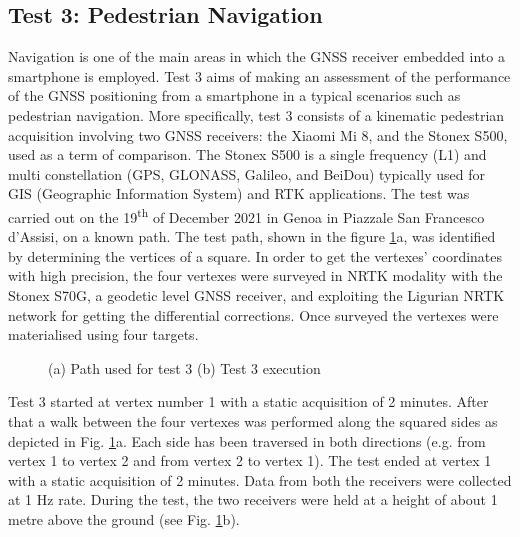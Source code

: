 \subsection{Test 3: Pedestrian Navigation}
Navigation is one of the main areas in which the GNSS receiver embedded into a smartphone is employed. 
Test 3 aims of making an assessment of the performance of the GNSS positioning from a smartphone in a typical 
scenarios such as  pedestrian navigation. 
More specifically, test 3 consists of a kinematic pedestrian acquisition involving two GNSS receivers: 
the Xiaomi Mi 8, and the Stonex S500, used as a term of comparison. The Stonex S500 is a single frequency (L1) 
and multi constellation (GPS, GLONASS, Galileo, and BeiDou) typically used for GIS (Geographic Information System) 
and RTK applications. 
The test was carried out on the 19\textsuperscript{th} of December 2021 in Genoa in Piazzale San Francesco d'Assisi, 
on a known path. The test path, shown in the figure \ref{FIG:test3_setup}a, was identified by determining the vertices of a 
square. In order to get the vertexes' coordinates with high precision, the four vertexes were surveyed in NRTK modality with 
the Stonex S70G, a geodetic level GNSS receiver, and exploiting the Ligurian NRTK network for getting the differential 
corrections. Once surveyed the vertexes were materialised using four targets. 
\begin{figure}[H] 
	\centering
    \caption{(a) Path used for test 3 (b) Test 3 execution}
	\label{FIG:test3_setup} 
\end{figure}
Test 3 started at vertex number 1 with a static acquisition of 2 minutes. 
After that a walk between the four vertexes was performed along the squared sides as depicted in Fig. \ref{FIG:test3_setup}a. 
Each side has been traversed in both directions (e.g. from vertex 1 to vertex 2 and from vertex 2 to vertex 1). 
The test ended at vertex 1 with a static acquisition of 2 minutes. Data from both the receivers were collected at 
1 Hz rate. During the test, the two receivers were held at a height of about 1 metre above the 
ground (see Fig. \ref{FIG:test3_setup}b).
